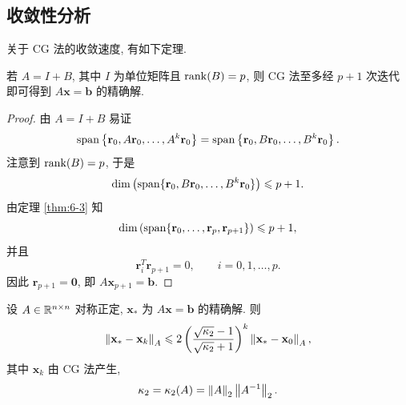 \subsection{收敛性分析}
\label{subsec:6-3-2}

关于 CG 法的收敛速度, 有如下定理.

\begin{theorem}
\label{thm:6-5}
若 $A=I+B$, 其中 $I$ 为单位矩阵且 $\operatorname{rank}(B)=p$, 则 CG 法至多经 $p+1$ 次迭代即可得到 $A\mathbf{x}=\mathbf{b}$ 的精确解.
\end{theorem}

\begin{proof}
由 $A=I+B$ 易证
\[
  \operatorname{span}\left\{\mathbf{r}_0,A\mathbf{r}_0,\ldots,A^k\mathbf{r}_0\right\}
  =\operatorname{span}\left\{\mathbf{r}_0,B\mathbf{r}_0,\ldots,B^k\mathbf{r}_0\right\}.
\]
注意到 $\operatorname{rank}(B)=p$, 于是
\[
  \dim\left(\operatorname{span}\{\mathbf{r}_0,B\mathbf{r}_0,\ldots,B^k\mathbf{r}_0\}\right)\leqslant p+1.
\]
由定理 \ref{thm:6-3} 知
\[
  \dim\left(\operatorname{span}\{\mathbf{r}_0,\ldots,\mathbf{r}_p,\mathbf{r}_{p+1}\}\right)\leqslant p+1,
\]
并且
\[
  \mathbf{r}_i^T\mathbf{r}_{p+1}=0,\qquad i=0,1,\ldots,p.
\]
因此 $\mathbf{r}_{p+1}=\mathbf{0}$, 即 $A\mathbf{x}_{p+1}=\mathbf{b}$.
\end{proof}

\begin{theorem}
\label{thm:6-6}
设 $A\in\mathbb{R}^{n\times n}$ 对称正定, $\mathbf{x}_*$ 为 $A\mathbf{x}=\mathbf{b}$ 的精确解. 则
\[
  \left\|\mathbf{x}_*-\mathbf{x}_k\right\|_A
  \leqslant2\left(\frac{\sqrt{\kappa_2}-1}{\sqrt{\kappa_2}+1}\right)^k
  \left\|\mathbf{x}_*-\mathbf{x}_0\right\|_A,
\]
其中 $\mathbf{x}_k$ 由 CG 法产生,
\[
  \kappa_2=\kappa_2(A)=\left\|A\right\|_2\left\|A^{-1}\right\|_2.
\]
\end{theorem}

